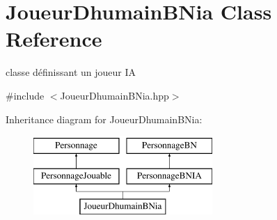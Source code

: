 \hypertarget{classJoueurDhumainBNia}{\section{Joueur\-Dhumain\-B\-Nia Class Reference}
\label{classJoueurDhumainBNia}
}


classe définissant un joueur I\-A  




{\ttfamily \#include $<$Joueur\-Dhumain\-B\-Nia.\-hpp$>$}

Inheritance diagram for Joueur\-Dhumain\-B\-Nia\-:\begin{figure}[H]
\begin{center}
\leavevmode
\includegraphics[height=3.000000cm]{classJoueurDhumainBNia}
\end{center}
\end{figure}
